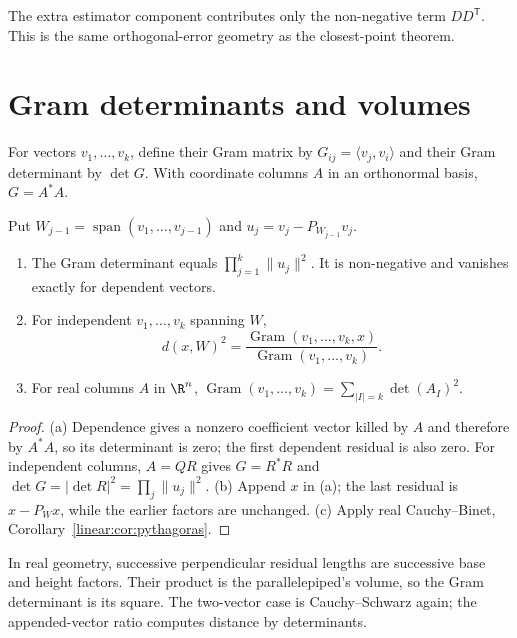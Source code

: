 The extra estimator component contributes only the non-negative term $DD^{\mathsf T}$. This is the same orthogonal-error geometry as the closest-point theorem.

\section{Gram determinants and volumes}

For vectors $v_1,\ldots,v_k$, define their Gram matrix by $G_{ij}=\langle v_j,v_i\rangle$ and their Gram determinant by $\det G$. With coordinate columns $A$ in an orthonormal basis, $G=A^*A$.

\begin{theorem}\label{linear:thm:gram}
Put $W_{j-1}=\operatorname{span}(v_1,\ldots,v_{j-1})$ and $u_j=v_j-P_{W_{j-1}}v_j$.
\begin{enumerate}[label=(\alph*)]
\item The Gram determinant equals $\prod_{j=1}^k\|u_j\|^2$. It is non-negative and vanishes exactly for dependent vectors.
\item For independent $v_1,\ldots,v_k$ spanning $W$,
\[d(x,W)^2=\frac{\operatorname{Gram}(v_1,\ldots,v_k,x)}{\operatorname{Gram}(v_1,\ldots,v_k)}.\]
\item For real columns $A$ in $\R^n$, $\operatorname{Gram}(v_1,\ldots,v_k)=\sum_{|I|=k}\det(A_I)^2$.
\end{enumerate}
\end{theorem}
\begin{proof}
(a) Dependence gives a nonzero coefficient vector killed by $A$ and therefore by $A^*A$, so its determinant is zero; the first dependent residual is also zero. For independent columns, $A=QR$ gives $G=R^*R$ and $\det G=|\det R|^2=\prod_j\|u_j\|^2$. (b) Append $x$ in (a); the last residual is $x-P_Wx$, while the earlier factors are unchanged. (c) Apply real Cauchy--Binet, Corollary~\ref{linear:cor:pythagoras}.
\end{proof}

In real geometry, successive perpendicular residual lengths are successive base and height factors. Their product is the parallelepiped's volume, so the Gram determinant is its square. The two-vector case is Cauchy--Schwarz again; the appended-vector ratio computes distance by determinants.

